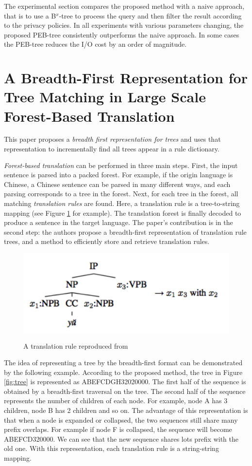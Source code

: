 \documentclass[paper=a4, fontsize=18pt]{article} %
\numberwithin{equation}{section} %
\numberwithin{figure}{section} %
\numberwithin{table}{section} %
\begin{document}
The experimental section compares the proposed method with a naive approach, that is to use a B$^x$-tree to process the query and then filter the result according to the privacy policies. In all experiments with various parameters changing, the proposed PEB-tree consistently outperforms the naive approach. In some cases the PEB-tree reduces the I/O cost by an order of magnitude.

\section{A Breadth-First Representation for Tree Matching in Large Scale Forest-Based Translation \cite{GBZ11}}

This paper proposes a \emph{breadth first representation for trees} and uses that representation to incrementally find all trees appear in a rule dictionary.

\emph{Forest-based translation} can be performed in three main steps. First, the input sentence is parsed into a packed forest. For example, if the origin language is Chinese, a Chinese sentence can be parsed in many different ways, and each parsing corresponds to a tree in the forest. Next, for each tree in the forest, all matching \emph{translation rules} are found. Here, a translation rule is a tree-to-string mapping (see Figure \ref{fig:rule} for example). The translation forest is finally decoded to produce a sentence in the target language. The paper's contribution is in the second step: the authors propose a breadth-first representation of translation rule trees, and a method to efficiently store and retrieve translation rules.

\begin{figure}[h]
  \centering
  \includegraphics[width=.7\linewidth]{74_1.png}\\
  \caption{A translation rule reproduced from \cite{MH08}}\label{fig:rule}
\end{figure}


The idea of representing a tree by the breadth-first format can be demonstrated by the following example. According to the proposed method, the tree in Figure \ref{fig:tree} is represented as ABEFCDGH32020000. The first half of the sequence is obtained by a breadth-first traversal on the tree. The second half of the sequence represents the number of children of each node. For example, node A has 3 children, node B has 2 children and so on. The advantage of this representation is that when a node is expanded or collapsed, the two sequences still share many prefix overlaps. For example if node F is collapsed, the sequence will become ABEFCD320000. We can see that the new sequence shares lots prefix with the old one. With this representation, each translation rule is a string-string mapping.
\end{document}
